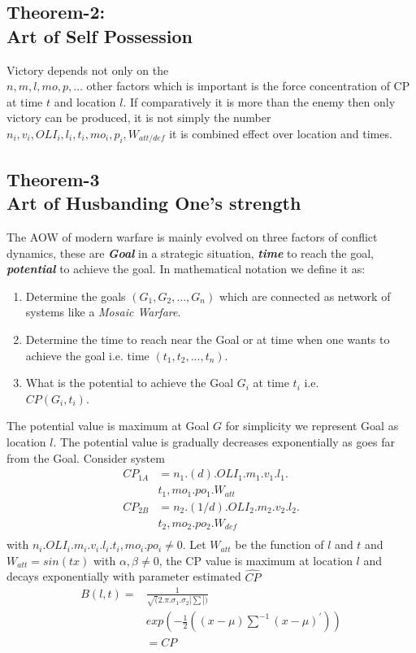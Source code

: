 \documentclass[]{article}
\begin{document}
\subsection{Theorem-2:\\Art of Self Possession}
Victory depends not only on the \\$n,m,l,mo,p,\dots$ other factors which is important is the force concentration of CP at time $t$ and location $l$. If comparatively it is more than the enemy then only victory can be produced, it is not simply the number $n_i,v_i,OLI_i,l_i,t_i,mo_i,p_i,W_{att/def}$ it is combined effect over location and times.
\newpage
\subsection{Theorem-3\\Art of Husbanding One's strength}
The AOW of modern warfare is mainly evolved on three factors of conflict dynamics, these are \textbf{\textit{Goal}} in a strategic situation, \textbf{\textit{time}} to reach the goal, \textbf{\textit{potential}} to achieve the goal. In mathematical notation we define it as:
\begin{enumerate}
    \item Determine the goals $({G_1,G_2,...,G_n})$ which are connected as network of systems like a {} \textit{\Gls{Mosaic Warfare}}. 
    \item Determine the time to reach near the Goal or at time when one wants to achieve the goal i.e. time $(t_1,t_2,...,t_n)$.
    \item What is the potential to achieve the Goal ${G_i}$ at time $t_i$ i.e.\\ ${CP(G_i,t_i)}$.
    
\end{enumerate}

The potential value is maximum at Goal $G$ for simplicity we represent Goal as location $l$. The potential value is gradually decreases exponentially as goes far from the Goal. Consider system
\begin{equation}
\begin{split}
    CP_{1A}&=n_1.(d).OLI_1.m_1.v_1.l_1.\\&t_1,mo_1.po_1.W_{att}\\
    CP_{2B}&=n_2.(1/d).OLI_2.m_2.v_2.l_2.\\&t_2,mo_2.po_2.W_{def}\\
\end{split}
\end{equation}
with $n_i.OLI_i.m_i.v_i.l_i.t_i,mo_i.po_i\neq 0$. Let $W_{att}$ be the function of $l$ and $t$ and $W_{att}=sin(tx)$ with $\alpha,\beta \neq 0 $, the CP value is maximum at location $l$ and decays exponentially with parameter estimated $\hat{CP}$
\begin{equation}
\begin{split}
    B(l,t)=&\frac{1}{\sqrt(2.\pi.\sigma_1.\sigma_2|\sum|)}\\&exp(-\frac{1}{2}((x-\mu){{\sum^{-1}}}(x-\mu)^{'} ))\\&=CP
\end{split}
\end{equation}
\end{document}
